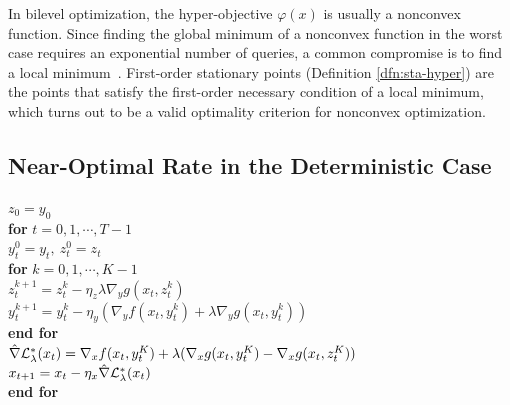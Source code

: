 \documentclass[twoside,11pt]{article}
\begin{document}
In bilevel optimization, the hyper-objective $\varphi(x)$ is usually a nonconvex function. Since finding the global minimum of a nonconvex function in the worst case requires an exponential number of
queries, a common compromise is to find a local minimum~\citep{ge2016matrix}. First-order stationary points (Definition \ref{dfn:sta-hyper}) are the points that satisfy the first-order necessary condition of a local minimum, which turns out to be a valid optimality criterion for nonconvex optimization.

\subsection{Near-Optimal Rate in the Deterministic Case}

\begin{algorithm*}[t]  
\caption{F${}^2$BA $(x_0,y_0)$} \label{alg:F2BA}
\begin{algorithmic}[1] 
\STATE $ z_0 = y_0$ \\[1mm]
\STATE \textbf{for} $ t =0,1,\cdots,T-1 $ \\[1mm]
\STATE \quad $ y_t^0 =  y_{t}, ~ z_t^0 = z_{t}$ \\[1mm]
\STATE \quad \textbf{for} $ k =0,1,\cdots,K-1$ \\[1mm]
\STATE \quad \quad $ z_t^{k+1} = z_t^{k}- \eta_z \lambda \nabla_y g(x_t, z_t^k)   $ \\[1mm]
\STATE \quad \quad $ y_t^{k+1} = y_t^k - \eta_y \left( \nabla_y f(x_t,y_t^k) +  \lambda  \nabla_y g(x_t,y_t^k) \right)$ \\[1mm]
\STATE \quad \textbf{end for} \\[1mm]
\STATE \quad $ \hat \nabla {\mathcal{L}}_{\lambda}^*(x_t)= \nabla_x f(x_t,y_{t}^K) + \lambda ( \nabla_x g(x_t,y_{t}^K) - \nabla_x g(x_t,z_{t}^K) )$ \\[1mm]
\STATE \quad  $x_{t+1} = x_t -  \eta_x  \hat \nabla {\mathcal{L}}_{\lambda}^*(x_t)$ \\[1mm]
\STATE \textbf{end for} \\[1mm]
\end{algorithmic}
\end{algorithm*}

\end{document}
